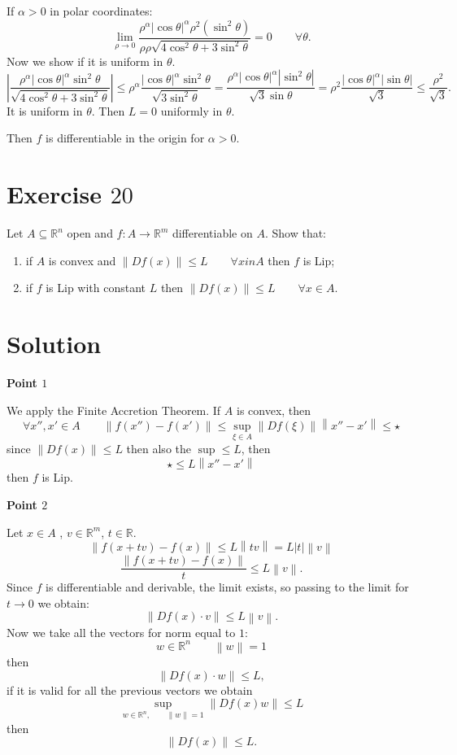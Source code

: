 \documentclass[a4paper, twoside, openany]{book}
\newcommand{\norm}[1]{\left\lVert#1\right\rVert}
\begin{document}
If $\alpha > 0$ in polar coordinates:
$$\lim_{\rho \rightarrow 0} \frac{\rho^{\alpha} |\cos \theta|^{\alpha} \rho^2 (\sin^2 \theta)}{\rho \rho \sqrt{4 \cos^2 \theta + 3 \sin^2 \theta}} = 0 \qquad \forall \theta.$$
Now we show if it is uniform in $\theta$.
$$|\frac{\rho^{\alpha} |\cos \theta|^{\alpha} \sin^2 \theta}{\sqrt{4 \cos^2 \theta + 3 \sin^2 \theta}}| \leq \rho^{\alpha} \frac{|\cos \theta|^{\alpha} \sin^2 \theta}{\sqrt{3 \sin^2 \theta}} = \frac{\rho^{\alpha} |\cos \theta|^{\alpha} |\sin^2 \theta|}{\sqrt{3} \sin \theta} = \rho^2 \frac{|\cos \theta|^{\alpha} |\sin \theta|}{\sqrt{3}} \leq \frac{\rho^2}{\sqrt{3}}.$$
It is uniform in $\theta$. Then $L = 0$ uniformly in $\theta$. \par  
Then $f$ is differentiable in the origin for $\alpha > 0$.
\clearpage
\section*{Exercise $20$}
Let $A \subseteq \mathbb{R}^n$ open and $f: A \rightarrow \mathbb{R}^m$ differentiable on $A$. Show that:
\begin{enumerate}
\item if $A$ is convex and $\norm{Df(x)} \leq L \qquad \forall x 	in A$ then $f$ is Lip;
\item if $f$ is Lip with constant $L$ then $\norm{Df(x)} \leq L \qquad \forall x \in A$.
\end{enumerate}
\section*{Solution}
\textbf{Point $1$} \par 
We apply the Finite Accretion Theorem. If $A$ is convex, then
$$\forall x'', x' \in A \qquad \norm{f(x'') - f(x')} \leq \sup_{\xi \in A} \norm{Df(\xi)} \norm{x'' - x'} \leq \star$$
since $\norm{Df(x)} \leq L$ then also the $\sup \leq L$, then
$$\star \leq L \norm{x'' - x'}$$
then $f$ is Lip. \par   
\textbf{Point $2$} \par   
Let $x \in A$ , $v \in \mathbb{R}^m$, $t \in \mathbb{R}$.
$$\norm{f(x + tv) - f(x)} \leq L \norm{t v} = L |t| \norm{v}$$
$$\frac{\norm{f(x + tv) - f(x)}}{t} \leq L \norm{v}.$$
Since $f$ is differentiable and derivable, the limit exists, so passing to the limit for $t \rightarrow 0$ we obtain:
$$\norm{Df(x) \cdot v} \leq L \norm{v}.$$
Now we take all the vectors for norm equal to $1$:
$$w \in \mathbb{R}^n \qquad \norm{w} = 1$$
then
$$\norm{Df(x) \cdot w } \leq L,$$
if it is valid for all the previous vectors we obtain
$$\sup_{w \in \mathbb{R}^n, \qquad \norm{w} = 1} \norm{Df(x) w} \leq L$$
then
$$\norm{Df(x)} \leq L.$$
\end{document}

